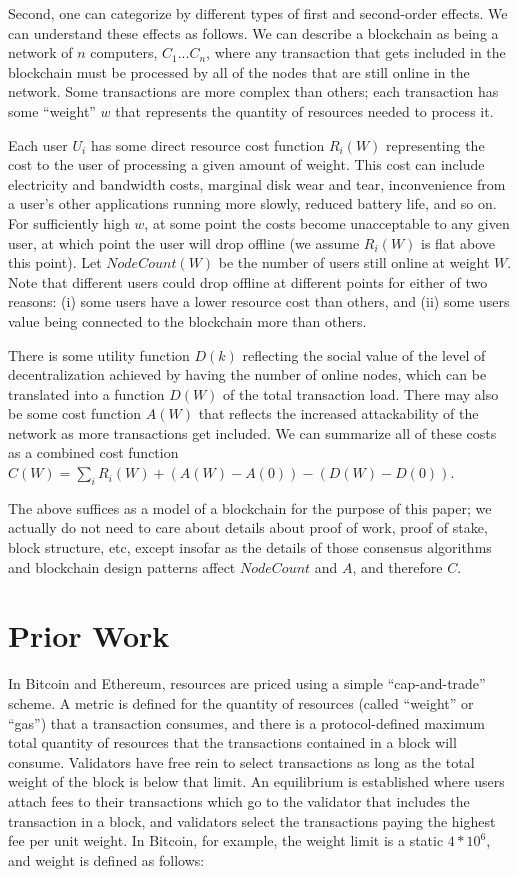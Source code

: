 \documentclass[12pt, final]{article}
\begin{document}
Second, one can categorize by different types of first and second-order effects. We can understand these effects as follows. We can describe a blockchain as being a network of $n$ computers, $C_1 ... C_n$, where any transaction that gets included in the blockchain must be processed by all of the nodes that are still online in the network. Some transactions are more complex than others; each transaction has some ``weight'' $w$ that represents the quantity of resources needed to process it.

Each user $U_i$ has some direct resource cost function $R_i(W)$ representing the cost to the user of processing a given amount of weight. This cost can include electricity and bandwidth costs, marginal disk wear and tear, inconvenience from a user's other applications running more slowly, reduced battery life, and so on. For sufficiently high $w$, at some point the costs become unacceptable to any given user, at which point the user will drop offline (we assume $R_i(W)$ is flat above this point). Let $NodeCount(W)$ be the number of users still online at weight $W$. Note that different users could drop offline at different points for either of two reasons: (i) some users have a lower resource cost than others, and (ii) some users value being connected to the blockchain more than others.

There is some utility function $D(k)$ reflecting the social value of the level of decentralization achieved by having the number of online nodes, which can be translated into a function $D(W)$ of the total transaction load. There may also be some cost function $A(W)$ that reflects the increased attackability of the network as more transactions get included. We can summarize all of these costs as a combined cost function $C(W) = \sum_i R_i(W) + (A(W) - A(0)) - (D(W) - D(0))$.

The above suffices as a model of a blockchain for the purpose of this paper; we actually do not need to care about details about proof of work, proof of stake, block structure, etc, except insofar as the details of those consensus algorithms and blockchain design patterns affect $NodeCount$ and $A$, and therefore $C$.

\section{Prior Work}

In Bitcoin and Ethereum, resources are priced using a simple ``cap-and-trade'' scheme. A metric is defined for the quantity of resources (called ``weight'' or ``gas'') that a transaction consumes, and there is a protocol-defined maximum total quantity of resources that the transactions contained in a block will consume. Validators have free rein to select transactions as long as the total weight of the block is below that limit. An equilibrium is established where users attach fees to their transactions which go to the validator that includes the transaction in a block, and validators select the transactions paying the highest fee per unit weight. In Bitcoin, for example, the weight limit is a static $4 *10^6$, and weight is defined as follows:
\end{document}
